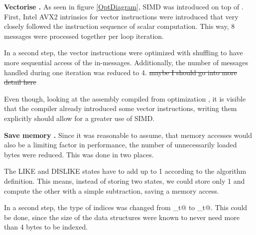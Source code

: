 \documentclass[letterpaper]{article}
\newcommand{\mypar}[1]{{\bf #1.}}
\begin{document}
\mypar{Vectorise }
As seen in figure \ref{OptDiagram}, SIMD was introduced on top of . First, Intel AVX2 intrinsics for vector instructions were introduced that very closely followed the instruction sequence of scalar computation. This way, 8 messages were processed together per loop iteration.

In a second step, the vector instructions were optimized with shuffling to have more sequential access of the in-messages. Additionally, the number of messages handled during one iteration was reduced to 4. \st{maybe I should go into more detail here}

Even though, looking at the assembly compiled from optimization , it is visible that the compiler already introduced some vector instructions, writing them explicitly should allow for a greater use of SIMD.

\mypar{Save memory }
Since it was reasonable to assume, that memory accesses would also be a limiting factor in performance, the number of unnecessarily loaded bytes were reduced. This was done in two places.

The LIKE and DISLIKE states have to add up to 1 according to the algorithm definition. This means, instead of storing two states, we could store only 1 and compute the other with a simple subtraction, saving a memory access.

In a second step, the type of indices was changed from \verb@size_t@ to _t@. This could be done, since the size of the data structures were known to never need more than 4 bytes to be indexed.
\end{document}
